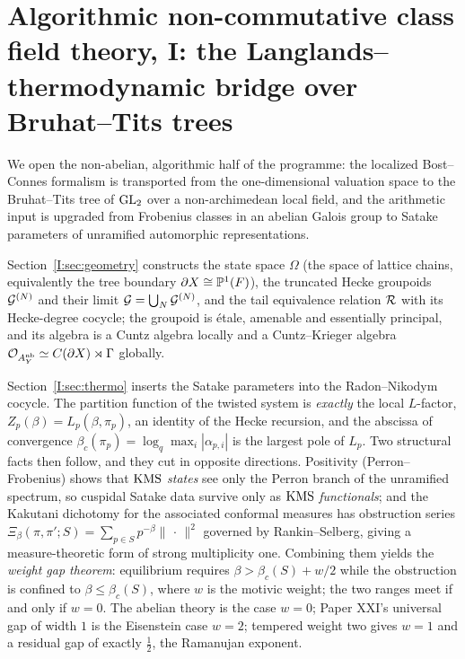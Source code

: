 \chapter[I. The Langlands--thermodynamic bridge over Bruhat--Tits trees]{Algorithmic non-commutative class field theory, I: the Langlands--thermodynamic bridge over Bruhat--Tits trees}\label{chap:I}
\begin{chapterabstract}
We open the non-abelian, algorithmic half of the programme: the localized Bost--Connes
formalism is transported from the one-dimensional valuation space to the Bruhat--Tits
tree of $\mathrm{GL}_2$ over a non-archimedean local field, and the arithmetic input is upgraded
from Frobenius classes in an abelian Galois group to Satake parameters of unramified
automorphic representations.

Section~\ref{I:sec:geometry} constructs the state space $\Omega$ (the space of lattice
chains, equivalently the tree boundary $\partial X\cong\mathbb{P}^1(F)$), the truncated Hecke
groupoids $\mathcal{G}^{(N)}$ and their limit $\mathcal{G}=\bigcup_N\mathcal{G}^{(N)}$, and the tail equivalence
relation $\mathcal{R}$ with its Hecke-degree cocycle; the groupoid is \'etale, amenable and
essentially principal, and its algebra is a Cuntz algebra locally and a Cuntz--Krieger
algebra $\mathcal{O}_{A^{\mathrm{nb}}_Y}\simeq C(\partial X)\rtimes\Gamma$ globally.

Section~\ref{I:sec:thermo} inserts the Satake parameters into the Radon--Nikodym cocycle.
The partition function of the twisted system is \emph{exactly} the local $L$-factor,
$Z_p(\beta)=L_p(\beta,\pi_p)$, an identity of the Hecke recursion, and the abscissa of
convergence $\beta_c(\pi_p)=\log_q\max_i|\alpha_{p,i}|$ is the largest pole of $L_p$. Two
structural facts then follow, and they cut in opposite directions. Positivity
(Perron--Frobenius) shows that $\mathrm{KMS}$ \emph{states} see only the Perron branch of the
unramified spectrum, so cuspidal Satake data survive only as $\mathrm{KMS}$ \emph{functionals};
and the Kakutani dichotomy for the associated conformal measures has obstruction series
$\Xi_\beta(\pi,\pi';S)=\sum_{p\in S}p^{-\beta}\|\,\cdot\,\|^2$ governed by
Rankin--Selberg, giving a measure-theoretic form of strong multiplicity one. Combining
them yields the \emph{weight gap theorem}: equilibrium requires
$\beta>\beta_c(S)+w/2$ while the obstruction is confined to $\beta\le\beta_c(S)$, where
$w$ is the motivic weight; the two ranges meet if and only if $w=0$. The abelian theory
is the case $w=0$; Paper XXI's universal gap of width $1$ is the Eisenstein case $w=2$;
tempered weight two gives $w=1$ and a residual gap of exactly $\tfrac12$, the Ramanujan
exponent.


\end{chapterabstract}
